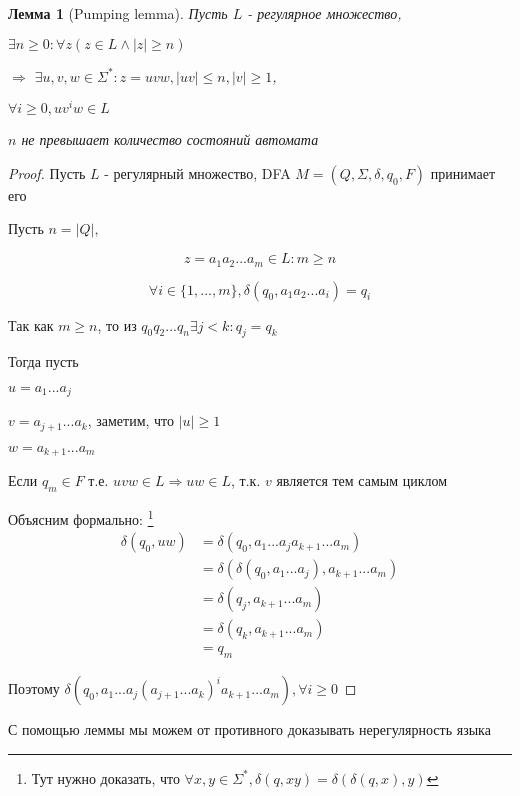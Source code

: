 \documentclass[5pt]{article}
\newtheorem{lemma}{Лемма}
\begin{document}
\begin{lemma}[Pumping lemma]
  Пусть $L$ - регулярное множество,

  $\exists n \geq 0 : \forall z (z \in L \land |z| \geq n) $

  $\Rightarrow$
  $\exists u,v,w \in \Sigma^* : z = uvw, |uv| \leq n, |v| \geq 1$,

  $\forall i \geq 0, uv^iw \in L$


  $n$ не превышает количество состояний автомата
\end{lemma}
\begin{proof}
  Пусть $L$ - регулярный множество, DFA $M = (Q, \Sigma, \delta ,q_0, F)$ принимает его 

  Пусть $n = |Q|,$

  $$z = a_1a_2...a_m \in L :  m \geq n$$

  $$\forall i \in \{1, ..., m\}, \delta(q_0, a_1a_2...a_i) = q_i$$

  Так как $m \geq n$, то из $q_0q_2...q_n \exists j < k : q_j = q_k$

  Тогда пусть

  $u = a_1...a_j$

  $v = a_{j+1}...a_k$, заметим, что $|u| \geq 1$

  $w = a_{k+1}...a_m$

  Если $q_m \in F$ т.е. $uvw \in L \Rightarrow uw \in L$, т.к. $v$ является тем самым циклом

  Объясним формально: \footnote{Тут нужно доказать, что $\forall x, y \in \Sigma^*, \delta(q, xy) = \delta(\delta(q, x), y)$}
  \[
    \begin{split}
      \delta(q_0, uw) & = \delta(q_0, a_1...a_ja_{k+1}...a_m) \\
      & = \delta(\delta(q_0, a_1...a_j),a_{k+1}...a_m) \\
      & = \delta(q_j,a_{k+1}...a_m) \\
      & = \delta(q_k,a_{k+1}...a_m) \\
      & = q_m
    \end{split}
  \]

  Поэтому 
  $\delta(q_0, a_1...a_j(a_{j+1}...a_k)^ia_{k+1}...a_m),  \forall i \geq 0$

\end{proof}

С помощью леммы мы можем от противного доказывать нерегулярность языка
\end{document}
